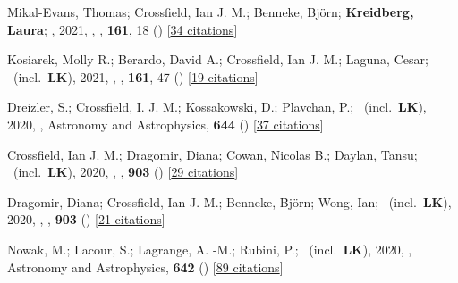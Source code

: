 \item[{\color{numcolor}\scriptsize48}] Mikal-Evans, Thomas; Crossfield, Ian J. M.; Benneke, Bj{\"o}rn; \textbf{Kreidberg, Laura}; \etal, 2021, , \aj, \textbf{161}, 18 () [\href{https://ui.adsabs.harvard.edu/abs/2021AJ....161...18M}{34 citations}]

\item[{\color{numcolor}\scriptsize47}] Kosiarek, Molly R.; Berardo, David A.; Crossfield, Ian J. M.; Laguna, Cesar; \etal\ (incl.\ \textbf{LK}), 2021, , \aj, \textbf{161}, 47 () [\href{https://ui.adsabs.harvard.edu/abs/2021AJ....161...47K}{19 citations}]

\item[{\color{numcolor}\scriptsize46}] Dreizler, S.; Crossfield, I. J. M.; Kossakowski, D.; Plavchan, P.; \etal\ (incl.\ \textbf{LK}), 2020, , Astronomy and Astrophysics, \textbf{644} () [\href{https://ui.adsabs.harvard.edu/abs/2020A&A...644A.127D}{37 citations}]

\item[{\color{numcolor}\scriptsize45}] Crossfield, Ian J. M.; Dragomir, Diana; Cowan, Nicolas B.; Daylan, Tansu; \etal\ (incl.\ \textbf{LK}), 2020, , \apj, \textbf{903} () [\href{https://ui.adsabs.harvard.edu/abs/2020ApJ...903L...7C}{29 citations}]

\item[{\color{numcolor}\scriptsize44}] Dragomir, Diana; Crossfield, Ian J. M.; Benneke, Bj{\"o}rn; Wong, Ian; \etal\ (incl.\ \textbf{LK}), 2020, , \apj, \textbf{903} () [\href{https://ui.adsabs.harvard.edu/abs/2020ApJ...903L...6D}{21 citations}]

\item[{\color{numcolor}\scriptsize43}] Nowak, M.; Lacour, S.; Lagrange, A. -M.; Rubini, P.; \etal\ (incl.\ \textbf{LK}), 2020, , Astronomy and Astrophysics, \textbf{642} () [\href{https://ui.adsabs.harvard.edu/abs/2020A&A...642L...2N}{89 citations}]

